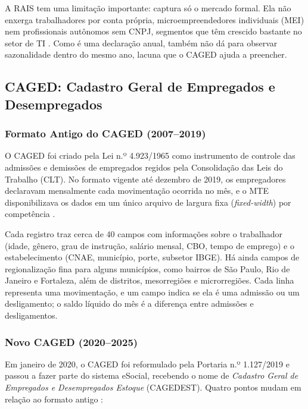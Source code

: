 A RAIS tem uma limitação importante: captura só o mercado formal. Ela não enxerga trabalhadores por conta própria, microempreendedores individuais (MEI) nem profissionais autônomos sem CNPJ, segmentos que têm crescido bastante no setor de TI \cite{IPEA2023}. Como é uma declaração anual, também não dá para observar sazonalidade dentro do mesmo ano, lacuna que o CAGED ajuda a preencher.


\subsection{CAGED: Cadastro Geral de Empregados e Desempregados}

\subsubsection{Formato Antigo do CAGED (2007--2019)}

O CAGED foi criado pela Lei n.º 4.923/1965 como instrumento de controle das admissões e demissões de empregados regidos pela Consolidação das Leis do Trabalho (CLT). No formato vigente até dezembro de 2019, os empregadores declaravam mensalmente cada movimentação ocorrida no mês, e o MTE disponibilizava os dados em um único arquivo de largura fixa (\textit{fixed-width}) por competência \cite{CAGED2024}.

Cada registro traz cerca de 40 campos com informações sobre o trabalhador (idade, gênero, grau de instrução, salário mensal, CBO, tempo de emprego) e o estabelecimento (CNAE, município, porte, subsetor IBGE). Há ainda campos de regionalização fina para alguns municípios, como bairros de São Paulo, Rio de Janeiro e Fortaleza, além de distritos, mesorregiões e microrregiões. Cada linha representa uma movimentação, e um campo indica se ela é uma admissão ou um desligamento; o saldo líquido do mês é a diferença entre admissões e desligamentos.

\subsubsection{Novo CAGED (2020--2025)}

Em janeiro de 2020, o CAGED foi reformulado pela Portaria n.º 1.127/2019 e passou a fazer parte do sistema eSocial, recebendo o nome de \textit{Cadastro Geral de Empregados e Desempregados Estoque} (CAGEDEST). Quatro pontos mudam em relação ao formato antigo \cite{CAGED2024}:

